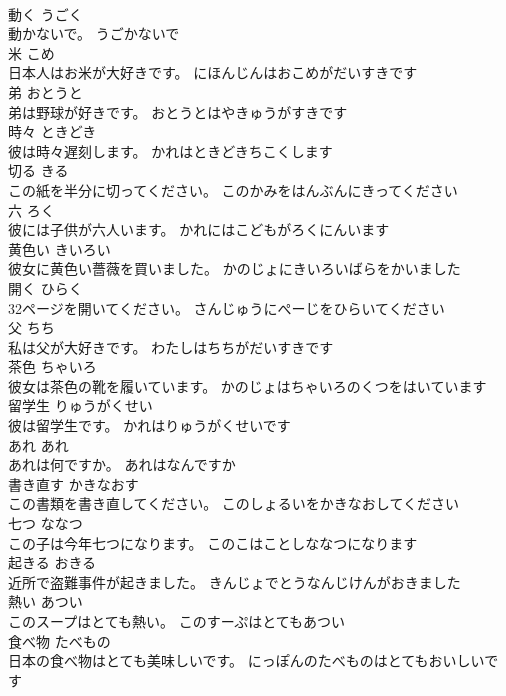 \documentclass[8pt]{extreport}
\begin{document}
\begin{CJK}{UTF8}{min}
\\	動く	うごく	
\\	動かないで。	うごかないで	
\\	米	こめ	
\\	日本人はお米が大好きです。	にほんじんはおこめがだいすきです	
\\	弟	おとうと	
\\	弟は野球が好きです。	おとうとはやきゅうがすきです	
\\	時々	ときどき	
\\	彼は時々遅刻します。	かれはときどきちこくします	
\\	切る	きる	
\\	この紙を半分に切ってください。	このかみをはんぶんにきってください	
\\	六	ろく	
\\	彼には子供が六人います。	かれにはこどもがろくにんいます	
\\	黄色い	きいろい	
\\	彼女に黄色い薔薇を買いました。	かのじょにきいろいばらをかいました	
\\	開く	ひらく	
\\	32ページを開いてください。	さんじゅうにぺーじをひらいてください	
\\	父	ちち	
\\	私は父が大好きです。	わたしはちちがだいすきです	
\\	茶色	ちゃいろ	
\\	彼女は茶色の靴を履いています。	かのじょはちゃいろのくつをはいています	
\\	留学生	りゅうがくせい	
\\	彼は留学生です。	かれはりゅうがくせいです	
\\	あれ	あれ	
\\	あれは何ですか。	あれはなんですか	
\\	書き直す	かきなおす	
\\	この書類を書き直してください。	このしょるいをかきなおしてください	
\\	七つ	ななつ	
\\	この子は今年七つになります。	このこはことしななつになります	
\\	起きる	おきる	
\\	近所で盗難事件が起きました。	きんじょでとうなんじけんがおきました	
\\	熱い	あつい	
\\	このスープはとても熱い。	このすーぷはとてもあつい	
\\	食べ物	たべもの	
\\	日本の食べ物はとても美味しいです。	にっぽんのたべものはとてもおいしいです	

\end{CJK}
\end{document}
